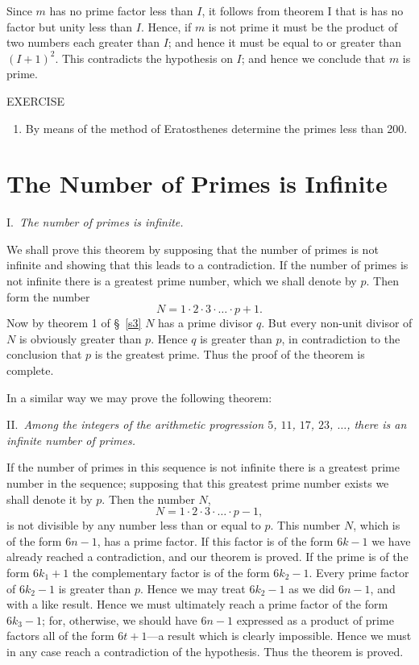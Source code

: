 \documentclass[oneside]{book}
\begin{document}
Since $m$ has no prime factor less than $I$, it follows from theorem
I that is has no factor but unity less than $I$. Hence, if $m$ is
not prime it must be the product of two numbers each greater than
$I$; and hence it must be equal to or greater than $(I+1)^2$. This
contradicts the hypothesis on $I$; and hence we conclude that $m$ is
prime.

\begin{center}
EXERCISE
\end{center}

\small \begin{enumerate}
\item[ ] By means of the method of Eratosthenes determine the primes
less than 200.
\end{enumerate}
\normalsize

\section{The Number of Primes is Infinite}\label{s4}%

I.~\emph{The number of primes is infinite.}

We shall prove this theorem by supposing that the number of primes
is not infinite and showing that this leads to a contradiction. If
the number of primes is not infinite there is a greatest prime
number, which we shall denote by $p$. Then form the number
\begin{equation*}
N = 1 \cdot 2 \cdot 3 \cdot \ldots \cdot p + 1.
\end{equation*}
Now by theorem 1 of \S~\ref{s3} $N$ has a prime divisor $q$. But
every non-unit divisor of $N$ is obviously greater than $p$. Hence
$q$ is greater than $p$, in contradiction to the conclusion that $p$
is the greatest prime. Thus the proof of the theorem is complete.

In a similar way we may prove the following theorem:

\smallskip II.~\emph{Among the integers of the arithmetic
progression $5$, $11$, $17$, $23$, $\ldots$, there is an infinite
number of primes.}

If the number of primes in this sequence is not infinite there is a
greatest prime number in the sequence; supposing that this greatest
prime number exists we shall denote it by $p$. Then the number $N$,
\begin{equation*}
N = 1 \cdot 2 \cdot 3 \cdot \ldots \cdot p-1,
\end{equation*}
is not divisible by any number less than or equal to $p$. This
number $N$, which is of the form $6n - 1$, has a prime factor. If
this factor is of the form $6k - 1$ we have already reached a
contradiction, and our theorem is proved. If the prime is of the
form $6k_1 + 1$ the complementary factor is of the form $6k_2 - 1$.
Every prime factor of $6k_2 - 1$ is greater than $p$. Hence we may
treat $6k_2 - 1$ as we did $6n - 1$, and with a like result. Hence
we must ultimately reach a prime factor of the form $6k_3 - 1$; for,
otherwise, we should have $6n - 1$ expressed as a product of prime
factors all of the form $6t + 1$---a result which is clearly
impossible. Hence we must in any case reach a contradiction of the
hypothesis. Thus the theorem is proved.
\end{document}
